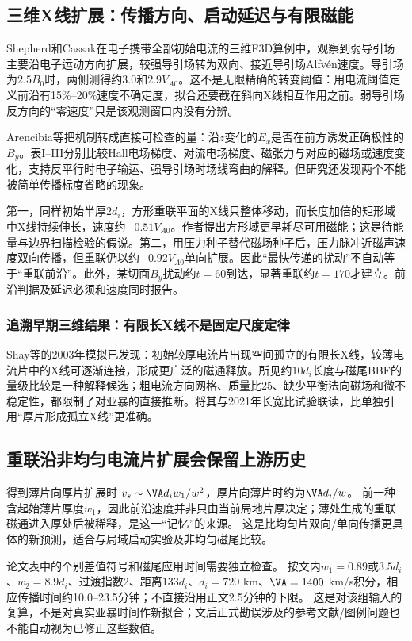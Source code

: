 \documentclass[UTF8,a4paper,11pt,openany,fontset=fandol]{ctexbook}
\begin{document}
\subsection{三维X线扩展：传播方向、启动延迟与有限磁能}
Shepherd和Cassak在电子携带全部初始电流的三维F3D算例中，观察到弱导引场主要沿电子运动方向扩展，较强导引场转为双向、接近导引场Alfvén速度。导引场为$2.5B_0$时，两侧测得约$3.0$和$2.9V_{\!A0}$。这不是无限精确的转变阈值：用电流阈值定义前沿有15\%--20\%速度不确定度，拟合还要截在斜向X线相互作用之前。弱导引场反方向的“零速度”只是该观测窗口内没有分辨。\citep{Shepherd2012}

Arencibia等把机制转成直接可检查的量：沿$z$变化的$E_x$是否在前方诱发正确极性的$B_y$。表I--III分别比较Hall电场梯度、对流电场梯度、磁张力与对应的磁场或速度变化，支持反平行时电子输运、强导引场时场线弯曲的解释。但研究还发现两个不能被简单传播标度省略的现象。\citep{L275}

第一，同样初始半厚$2d_i$，方形重联平面的X线只整体移动，而长度加倍的矩形域中X线持续伸长，速度约$-0.51V_{\!A0}$。作者提出方形域更早耗尽可用磁能；这是待能量与边界扫描检验的假说。第二，用压力种子替代磁场种子后，压力脉冲近磁声速度双向传播，但重联仍以约$-0.92V_{\!A0}$单向扩展。因此“最快传递的扰动”不自动等于“重联前沿”。此外，某切面$B_y$扰动约$t=60$到达，显著重联约$t=170$才建立。前沿判据及延迟必须和速度同时报告。

\subsubsection{追溯早期三维结果：有限长X线不是固定尺度定律}
Shay等的2003年模拟已发现：初始较厚电流片出现空间孤立的有限长X线，较薄电流片中的X线可逐渐连接，形成更广泛的磁通释放。所见约$10d_i$长度与磁尾BBF的量级比较是一种解释候选；粗电流方向网格、质量比25、缺少平衡法向磁场和微不稳定性，都限制了对亚暴的直接推断。将其与2021年长宽比试验联读，比单独引用“厚片形成孤立X线”更准确。\citep{Shay2003,L275}

\subsection{重联沿非均匀电流片扩展会保留上游历史}
\citet{L294}得到薄片向厚片扩展时
$v_s\sim\VA d_iw_1/w^2$，厚片向薄片时约为$\VA d_i/w$。
前一种含起始薄片厚度$w_1$，因此前沿速度并非只由当前局地片厚决定；薄处生成的重联磁通进入厚处后被稀释，是这一“记忆”的来源。
这是比均匀片双向/单向传播更具体的新预测，适合与局域启动实验及非均匀磁尾比较。

论文表中的个别差值符号和磁尾应用时间需要独立检查。
按文内$w_1=0.89$或$3.5d_i$、$w_2=8.9d_i$、过渡指数2、距离$133d_i$、$d_i=720$ km、$\VA=1400$ km/s积分，相应传播时间约10.0--23.5分钟；不直接沿用正文2.5分钟的下限。
这是对该组输入的复算，不是对真实亚暴时间作新拟合；文后正式勘误涉及的参考文献/图例问题也不能自动视为已修正这些数值。
\end{document}
